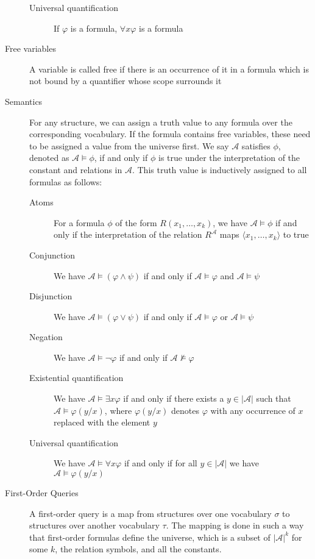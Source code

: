 \begin{description}
\begin{description}
        \item[Universal quantification] If $\varphi$ is a formula, $\forall x \varphi$ is a formula
    \end{description}
    \item[Free variables] A variable is called free if there is an occurrence of it in a formula which is not bound by a quantifier whose scope surrounds it
    \item[Semantics] For any structure, we can assign a truth value to any formula over the corresponding vocabulary.
    If the formula contains free variables, these need to be assigned a value from the universe first.
    We say $\mathcal{A}$ satisfies $\phi$, denoted as $\mathcal{A} \models \phi$, if and only if $\phi$ is true under the interpretation of the constant and relations in $\mathcal{A}$.
    This truth value is inductively assigned to all formulas as follows:
    \begin{description}
        \item[Atoms] For a formula $\phi$ of the form $R(x_1, \dots, x_k)$, we have $\mathcal{A} \models \phi$ if and only if the interpretation of the relation $R^{\mathcal{A}}$ maps $\langle x_1, \dots, x_k \rangle$ to true
        \item[Conjunction] We have $\mathcal{A} \models (\varphi \land \psi)$ if and only if $\mathcal{A} \models \varphi$ and $\mathcal{A} \models \psi$
        \item[Disjunction]  We have $\mathcal{A} \models (\varphi \lor \psi)$ if and only if $\mathcal{A} \models \varphi$ or $\mathcal{A} \models \psi$
        \item[Negation] We have $\mathcal{A} \models \lnot \varphi$ if and only if $\mathcal{A} \not\models \varphi$
        \item[Existential quantification] We have $\mathcal{A} \models \exists x\varphi$ if and only if there exists a $y \in |\mathcal{A}|$ such that $\mathcal{A} \models \varphi(y / x)$, where $\varphi(y / x)$ denotes $\varphi$ with any occurrence of $x$ replaced with the element $y$
        \item[Universal quantification] We have $\mathcal{A} \models \forall x\varphi$ if and only if for all $y \in |\mathcal{A}|$ we have $\mathcal{A} \models \varphi(y / x)$
    \end{description}
    \item[First-Order Queries] A first-order query is a map from structures over one vocabulary $\sigma$ to structures over another vocabulary $\tau$.
    The mapping is done in such a way that first-order formulas define the universe, which is a subset of $|\mathcal{A}|^k$ for some $k$, the relation symbols, and all the constants.

\end{description}
